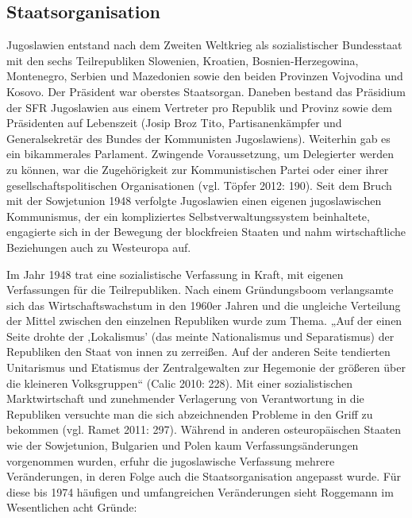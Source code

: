 \subsection{Staatsorganisation }
Jugoslawien entstand nach dem Zweiten Weltkrieg als sozialistischer Bundesstaat mit den sechs Teilrepubliken Slowenien, Kroatien, Bosnien-Herzegowina, Montenegro, Serbien und Mazedonien sowie den beiden Provinzen Vojvodina und Kosovo. Der Präsident war oberstes Staatsorgan. Daneben bestand das Präsidium der SFR Jugoslawien aus einem Vertreter pro Republik und Provinz sowie dem Präsidenten auf Lebenszeit (Josip Broz Tito, Partisanenkämpfer und Generalsekretär des Bundes der Kommunisten Jugoslawiens). Weiterhin gab es ein bikammerales Parlament. Zwingende Voraussetzung, um Delegierter werden zu können, war die Zugehörigkeit zur Kommunistischen Partei oder einer ihrer gesellschaftspolitischen Organisationen (vgl. Töpfer 2012: 190). Seit dem Bruch mit der Sowjetunion 1948 verfolgte Jugoslawien einen eigenen jugoslawischen Kommunismus, der ein kompliziertes Selbstverwaltungssystem beinhaltete, engagierte sich in der Bewegung der blockfreien Staaten und nahm wirtschaftliche Beziehungen auch zu Westeuropa auf.\par
Im Jahr 1948 trat eine sozialistische Verfassung in Kraft, mit eigenen Verfassungen für die Teilrepubliken. Nach einem Gründungsboom verlangsamte sich das Wirtschaftswachstum in den 1960er Jahren und die ungleiche Verteilung der Mittel zwischen den einzelnen Republiken wurde zum Thema. „Auf der einen Seite drohte der ‚Lokalismus’ (das meinte Nationalismus und Separatismus) der Republiken den Staat von innen zu zerreißen. Auf der anderen Seite tendierten Unitarismus und Etatismus der Zentralgewalten zur Hegemonie der größeren über die kleineren Volksgruppen“ (Calic 2010: 228). Mit einer sozialistischen Marktwirtschaft und zunehmender Verlagerung von Verantwortung in die Republiken versuchte man die sich abzeichnenden Probleme in den Griff zu bekommen (vgl. Ramet 2011: 297). Während in anderen osteuropäischen Staaten wie der Sowjetunion, Bulgarien und Polen kaum Verfassungsänderungen vorgenommen wurden, erfuhr die jugoslawische Verfassung mehrere Veränderungen, in deren Folge auch die Staatsorganisation angepasst wurde. Für diese bis 1974 häufigen und umfangreichen Veränderungen sieht Roggemann im Wesentlichen acht Gründe:
